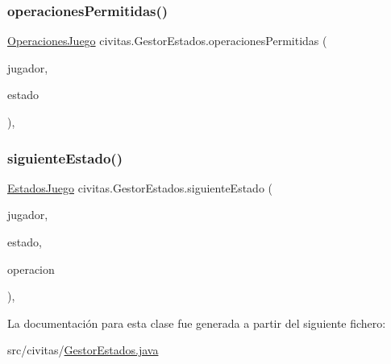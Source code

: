 \mbox{\label{classcivitas_1_1GestorEstados_afedd35720a2151fc774302109811685b}} 
\subsubsection{\texorpdfstring{operaciones\+Permitidas()}{operacionesPermitidas()}}
{\footnotesize\ttfamily \hyperlink{enumcivitas_1_1OperacionesJuego}{Operaciones\+Juego} civitas.\+Gestor\+Estados.\+operaciones\+Permitidas (\begin{DoxyParamCaption}\item[{\hyperlink{classcivitas_1_1Jugador}{Jugador}}]{jugador,  }\item[{\hyperlink{enumcivitas_1_1EstadosJuego}{Estados\+Juego}}]{estado }\end{DoxyParamCaption})\hspace{0.3cm}{\ttfamily [inline]}, {\ttfamily [package]}}

\mbox{\label{classcivitas_1_1GestorEstados_ab7195ef0d67677a23f48182f185a85c5}} 
\subsubsection{\texorpdfstring{siguiente\+Estado()}{siguienteEstado()}}
{\footnotesize\ttfamily \hyperlink{enumcivitas_1_1EstadosJuego}{Estados\+Juego} civitas.\+Gestor\+Estados.\+siguiente\+Estado (\begin{DoxyParamCaption}\item[{\hyperlink{classcivitas_1_1Jugador}{Jugador}}]{jugador,  }\item[{\hyperlink{enumcivitas_1_1EstadosJuego}{Estados\+Juego}}]{estado,  }\item[{\hyperlink{enumcivitas_1_1OperacionesJuego}{Operaciones\+Juego}}]{operacion }\end{DoxyParamCaption})\hspace{0.3cm}{\ttfamily [inline]}, {\ttfamily [package]}}



La documentación para esta clase fue generada a partir del siguiente fichero\+:\begin{DoxyCompactItemize}
\item 
src/civitas/\hyperlink{GestorEstados_8java}{Gestor\+Estados.\+java}\end{DoxyCompactItemize}
